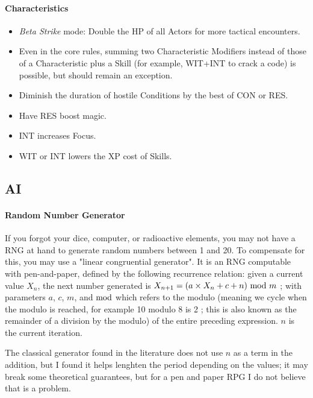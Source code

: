 \paragraph{Characteristics}

\begin{itemize}
    \item \textit{Beta Strike} mode: Double the HP of all Actors for more tactical encounters.
    \item Even in the core rules, summing two Characteristic Modifiers instead of those of a Characteristic plus a Skill (for example, WIT+INT to crack a code) is possible, but should remain an exception.
    \item Diminish the duration of hostile Conditions by the best of CON or RES.
    \item Have RES boost magic.
    \item INT increases Focus.
    \item WIT or INT lowers the XP cost of Skills.
\end{itemize}




\subsection{AI}

\paragraph{Random Number Generator}

If you forgot your dice, computer, or radioactive elements, you may not have a RNG at hand to generate random numbers between 1 and 20. To compensate for this, you may use a "linear congruential generator". It is an RNG computable with pen-and-paper, defined by the following recurrence relation: given a current value $X_n$, the next number generated is $X_{n+1}=(a \times X_n + c + n)\ \textup{mod}\ m$ ; with parameters $a$, $c$, $m$, and $\textup{mod}$ which refers to the modulo (meaning we cycle when the modulo is reached, for example 10 modulo 8 is 2 ; this is also known as the remainder of a division by the modulo) of the entire preceding expression. $n$ is the current iteration. 

The classical generator found in the literature does not use $n$ as a term in the addition, but I found it helps lenghten the period depending on the values; it may break some theoretical guarantees, but for a pen and paper RPG I do not believe that is a problem.

